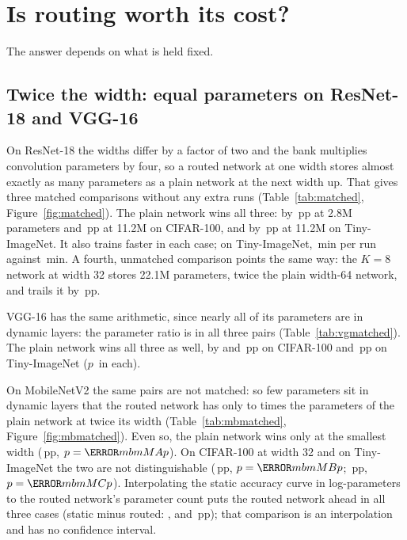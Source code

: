 \documentclass[10pt,a4paper]{article}
\begin{document}
\section{Is routing worth its cost?}\label{sec:cost}

The answer depends on what is held fixed.

\subsection{Twice the width: equal parameters on ResNet-18 and VGG-16}\label{sec:matched}

On ResNet-18 the widths differ by a factor of two and the bank multiplies
convolution parameters by four, so a routed network at one width stores
almost exactly as many parameters as a plain network at the next width
up. That gives three matched comparisons without any extra runs
(Table~\ref{tab:matched}, Figure~\ref{fig:matched}). The plain network
wins all three: by \,pp at 2.8M parameters and \,pp at 11.2M
on CIFAR-100, and by \,pp at 11.2M on Tiny-ImageNet. It also trains
faster in each case; on Tiny-ImageNet, \,min per run against
\,min. A fourth, unmatched comparison points the same way: the
$K=8$ network at width 32 stores 22.1M parameters, twice the plain
width-64 network, and trails it by \,pp.

VGG-16 has the same arithmetic, since nearly all of its parameters are in
dynamic layers: the parameter ratio is  in all three pairs
(Table~\ref{tab:vgmatched}). The plain network wins all three as well, by
 and \,pp on CIFAR-100 and \,pp on
Tiny-ImageNet ($p$\, in each).

On MobileNetV2 the same pairs are not matched: so few parameters sit in
dynamic layers that the routed network has only  to 
times the parameters of the plain network at twice its width
(Table~\ref{tab:mbmatched}, Figure~\ref{fig:mbmatched}). Even so, the
plain network wins only at the smallest width (\,pp,
$p=\V{mbmMAp}$). On CIFAR-100 at width 32 and on Tiny-ImageNet the two are
not distinguishable (\,pp, $p=\V{mbmMBp}$; \,pp,
$p=\V{mbmMCp}$). Interpolating the static accuracy curve in
log-parameters to the routed network's parameter count puts the routed
network ahead in all three cases (static minus routed: ,
 and \,pp); that comparison is an interpolation and has
no confidence interval.
\end{document}
